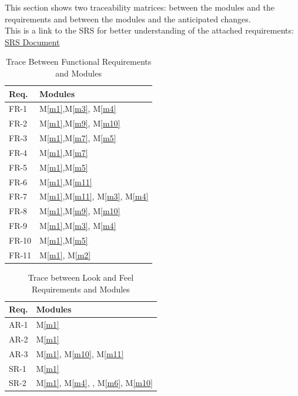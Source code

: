 \documentclass[12pt, titlepage]{article}
\newcommand{\mref}[1]{M\ref{#1}}
\begin{document}
This section shows two traceability matrices: between the modules and the
requirements and between the modules and the anticipated changes. \\
This is a link to the SRS for better understanding of the attached requirements: \href{https://github.com/VirochaanRG/MES-Event-Management-System/blob/main/docs/SRS/SRS.pdf}{SRS Document}
\begin{table}[H]
\centering
\begin{tabular}{p{} p{}}
\toprule
\textbf{Req.} & \textbf{Modules}\\
\midrule
FR-1 & \mref{m1},\mref{m3}, \mref{m4}\\
FR-2 & \mref{m1},\mref{m9}, \mref{m10}\\
FR-3 & \mref{m1},\mref{m7}, \mref{m5}\\
FR-4 & \mref{m1},\mref{m7}\\
FR-5 & \mref{m1},\mref{m5}\\
FR-6 & \mref{m1},\mref{m11}\\
FR-7 & \mref{m1},\mref{m11}, \mref{m3}, \mref{m4}\\
FR-8 & \mref{m1},\mref{m9}, \mref{m10}\\
FR-9 & \mref{m1},\mref{m3}, \mref{m4}\\
FR-10 & \mref{m1},\mref{m5}\\
FR-11 & \mref{m1}, \mref{m2}\\


\bottomrule
\end{tabular}
\caption{Trace Between Functional Requirements and Modules}
\label{TblRT}
\end{table}

\begin{table}[H]
\centering
\begin{tabular}{p{} p{}}
\toprule
\textbf{Req.} & \textbf{Modules}\\
\midrule
AR-1 & \mref{m1} \\
AR-2 & \mref{m1} \\
AR-3 & \mref{m1}, \mref{m10}, \mref{m11} \\
SR-1 & \mref{m1}\\
SR-2 & \mref{m1}, \mref{m4}, , \mref{m6}, \mref{m10} \\
\bottomrule
\end{tabular}
\caption{Trace between Look and Feel Requirements and Modules}
\label{TblRT_LF}
\end{table}
\end{document}
